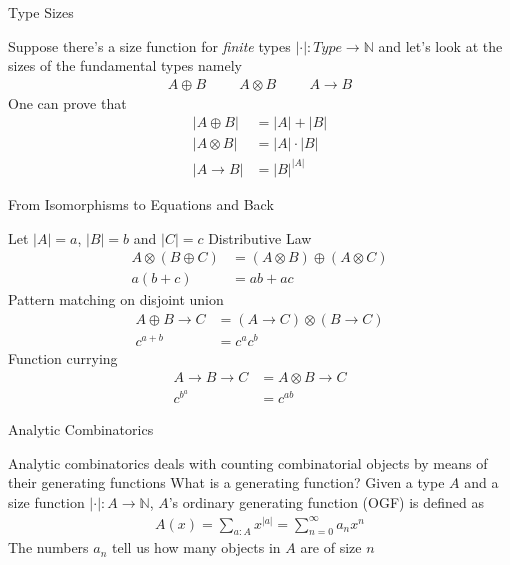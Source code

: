 \documentclass[pdf]{beamer}
\begin{document}
\begin{frame}{Type Sizes}
  \begin{outline}
    \1 Suppose there's a size function for \textit{finite} types $|\cdot| : Type \to \mathbb{N}$ and let's look at the sizes of the fundamental types namely
    \begin{align*}
      A \oplus B \hspace{1cm} A \otimes B \hspace{1cm} A \to B
    \end{align*}
    \1 One can prove that
    \begin{align*}
      |A \oplus B| &= |A| + |B| \\
      |A \otimes B| &= |A| \cdot |B| \\
      |A \to B| &= |B|^{|A|}
    \end{align*}
  \end{outline}
\end{frame}

\begin{frame}{From Isomorphisms to Equations and Back}
  \begin{outline}
    \1 Let $|A| = a$, $|B| = b$ and $|C| = c$
    \1 Distributive Law
    \begin{align*}
      A \otimes (B \oplus C) &= (A \otimes B) \oplus (A \otimes C) \\
      a(b+c) &= a b + a c
    \end{align*}
    \1 Pattern matching on disjoint union
    \begin{align*}
      A \oplus B \to C &= (A \to C) \otimes (B \to C) \\
      c^{a+b} &= c^{a} c^{b}
    \end{align*}
    \1 Function currying
    \begin{align*}
      A \to B \to C &= A \otimes B \to C \\
      c^{b^{a}} &= c^{a b}
    \end{align*}
  \end{outline}
\end{frame}

\begin{frame}{Analytic Combinatorics}
  \begin{outline}
    \1 Analytic combinatorics deals with counting combinatorial objects by means of their generating functions
    \1 What is a generating function?
    \1 Given a type $A$ and a size function $|\cdot| : A \to \mathbb{N}$, $A$'s ordinary generating function (OGF) is defined as
    \begin{align*}
      A(x) = \sum_{a : A}{x^{|a|}} = \sum_{n=0}^{\infty}{a_n x^n}
    \end{align*}
    \1 The numbers $a_n$ tell us how many objects in $A$ are of size $n$
  \end{outline}
\end{frame}
\end{document}
